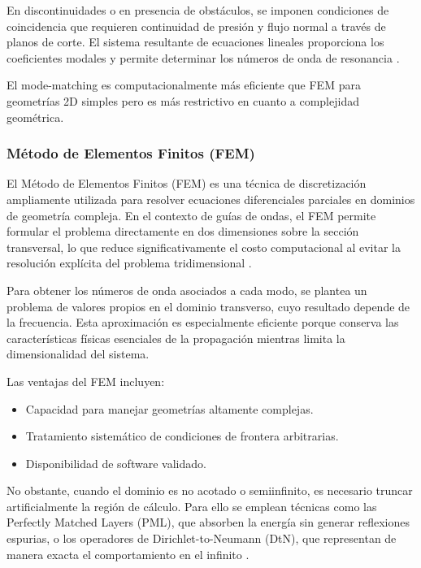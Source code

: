 \documentclass[11pt]{article}
\begin{document}
En discontinuidades o en presencia de obstáculos, se imponen condiciones de coincidencia que requieren continuidad de presión y flujo normal a través de planos de corte. El sistema resultante de ecuaciones lineales proporciona los coeficientes modales y permite determinar los números de onda de resonancia \cite{Klaren1994, Alkuhayli2025}.

El mode-matching es computacionalmente más eficiente que FEM para geometrías 2D simples pero es más restrictivo en cuanto a complejidad geométrica.

\subsubsection{Método de Elementos Finitos (FEM)}\label{subsubsec:fem}

El Método de Elementos Finitos (FEM) es una técnica de discretización ampliamente utilizada para resolver ecuaciones diferenciales parciales en dominios de geometría compleja. En el contexto de guías de ondas, el FEM permite formular el problema directamente en dos dimensiones sobre la sección transversal, lo que reduce significativamente el costo computacional al evitar la resolución explícita del problema tridimensional \cite{Finnveden2012, Dostart2017}.

Para obtener los números de onda asociados a cada modo, se plantea un problema de valores propios en el dominio transverso, cuyo resultado depende de la frecuencia. Esta aproximación es especialmente eficiente porque conserva las características físicas esenciales de la propagación mientras limita la dimensionalidad del sistema.

Las ventajas del FEM incluyen:
\begin{itemize}
\item Capacidad para manejar geometrías altamente complejas.
\item Tratamiento sistemático de condiciones de frontera arbitrarias.
\item Disponibilidad de software validado.
\end{itemize}

No obstante, cuando el dominio es no acotado o semiinfinito, es necesario truncar artificialmente la región de cálculo. Para ello se emplean técnicas como las Perfectly Matched Layers (PML), que absorben la energía sin generar reflexiones espurias, o los operadores de Dirichlet-to-Neumann (DtN), que representan de manera exacta el comportamiento en el infinito \cite{Casenavea2014}.
\end{document}
